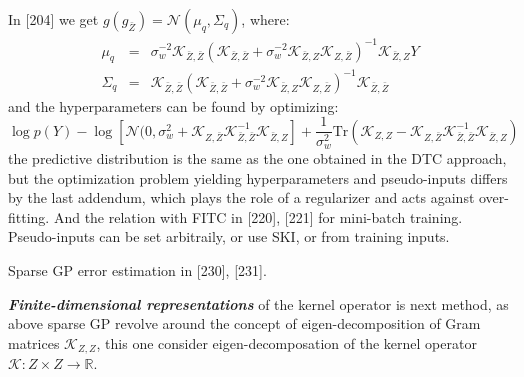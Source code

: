 \documentclass[10pt]{elegantbook}
\newcommand{\mydefination}[1]{\textbf{\textit{\textcolor{structurecolor}{#1}}}}
\begin{document}
In [204] we get $g(g_{\bar Z}) = \mathcal N(\mu_q, \Sigma_q)$, where:
\[
\begin{array}{lll}
    \mu_{q} &=& \sigma_{w}^{-2}\mathscr{K}_{\bar{Z}, \bar{Z}}(\mathscr{K}_{\bar{Z}, \bar{Z}}+\sigma_{w}^{-2}\mathscr{K}_{\bar{Z}, Z}\mathscr{K}_{Z, \bar{Z}})^{-1}\mathscr{K}_{\bar{Z}, Z}Y \\
    \Sigma_q &=& \mathscr{K}_{\bar{Z}, \bar{Z}} (\mathscr{K}_{\bar{Z}, \bar{Z}} + \sigma_{w}^{-2}\mathscr{K}_{\bar{Z}, Z}\mathscr{K}_{Z, \bar{Z}})^{-1} \mathscr{K}_{\bar{Z}, \bar{Z}}
\end{array}
\]
and the hyperparameters can be found by optimizing:
\[
\log p(Y) - \log [ \mathcal N(0,\sigma_{w}^{2}+\mathscr{K}_{Z, \bar{Z}} \mathscr{K}_{\bar{Z}, \bar{Z}}^{-1} \mathscr{K}_{\bar{Z}, Z} ] + \frac{1}{\sigma^2_w} 
\text{Tr}(\mathscr{K}_{Z, Z} - \mathscr{K}_{Z, \bar{Z}} \mathscr{K}_{\bar{Z}, \bar{Z}}^{-1} \mathscr{K}_{\bar{Z}, Z})
\]
the predictive distribution is the same as the one obtained in the DTC approach, but the optimization problem yielding 
hyperparameters and pseudo-inputs differs by the last  addendum, which plays the role of a regularizer and
acts against over-fitting. And the relation with FITC in [220], [221] for mini-batch training. Pseudo-inputs can be set 
arbitraily, or use SKI, or from training inputs.

Sparse GP error estimation in [230], [231].

\mydefination{Finite-dimensional representations} of the kernel operator is next method, as above sparse GP revolve
around the concept of eigen-decomposition of Gram matrices $\mathscr{K}_{Z, Z}$, this one consider eigen-decomposation of the kernel operator
$\mathscr{K}: Z \times Z \rightarrow \mathbb R$.
\end{document}
